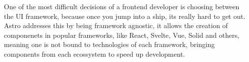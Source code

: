 One of the most difficult decisions of a frontend developer is choosing between the UI framework, because once you jump into a ship, its really hard to get out. Astro addresses this by being framework agnostic, it allows the creation of componenets in popular frameworks, like React, Svelte, Vue, Solid and others, meaning one is not bound to technologies of each framework, bringing components from each ecossystem to speed up development.
